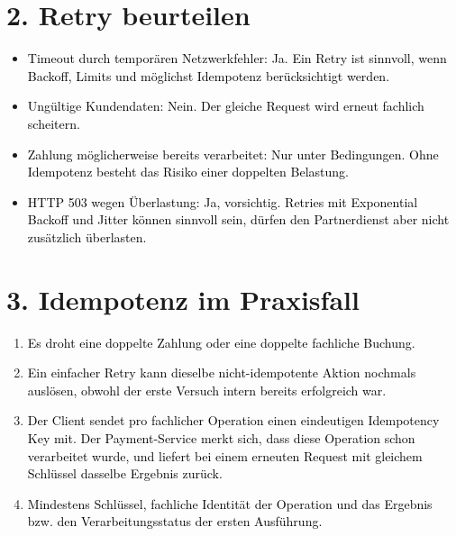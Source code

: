\documentclass[11pt,a4paper]{article}
\newcommand{\solution}[1]{\textcolor{black}{#1}}
\begin{document}
\section*{2. Retry beurteilen}
\begin{itemize}
  \item \solution{Timeout durch temporären Netzwerkfehler: Ja. Ein Retry ist sinnvoll, wenn Backoff, Limits und möglichst Idempotenz berücksichtigt werden.}
  \item \solution{Ungültige Kundendaten: Nein. Der gleiche Request wird erneut fachlich scheitern.}
  \item \solution{Zahlung möglicherweise bereits verarbeitet: Nur unter Bedingungen. Ohne Idempotenz besteht das Risiko einer doppelten Belastung.}
  \item \solution{HTTP 503 wegen Überlastung: Ja, vorsichtig. Retries mit Exponential Backoff und Jitter können sinnvoll sein, dürfen den Partnerdienst aber nicht zusätzlich überlasten.}
\end{itemize}

\section*{3. Idempotenz im Praxisfall}
\begin{enumerate}
  \item \solution{Es droht eine doppelte Zahlung oder eine doppelte fachliche Buchung.}
  \item \solution{Ein einfacher Retry kann dieselbe nicht-idempotente Aktion nochmals auslösen, obwohl der erste Versuch intern bereits erfolgreich war.}
  \item \solution{Der Client sendet pro fachlicher Operation einen eindeutigen Idempotency Key mit. Der Payment-Service merkt sich, dass diese Operation schon verarbeitet wurde, und liefert bei einem erneuten Request mit gleichem Schlüssel dasselbe Ergebnis zurück.}
  \item \solution{Mindestens Schlüssel, fachliche Identität der Operation und das Ergebnis bzw. den Verarbeitungsstatus der ersten Ausführung.}
\end{enumerate}
\end{document}
